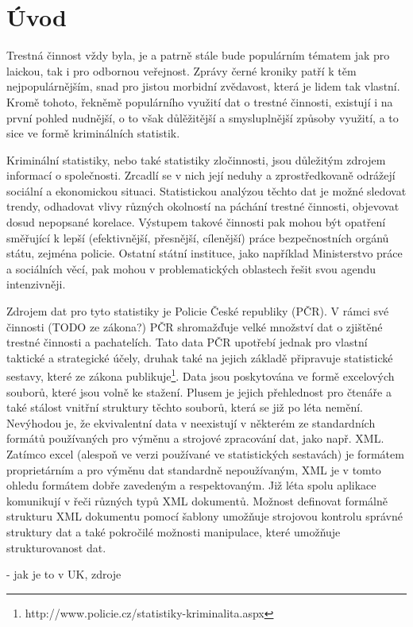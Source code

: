 \chapter*{Úvod}

Trestná činnost vždy byla, je a patrně stále bude populárním tématem jak pro laickou, tak i pro odbornou veřejnost. Zprávy černé kroniky patří k těm nejpopulárnějším, snad pro jistou morbidní zvědavost, která je lidem tak vlastní. Kromě tohoto, řekněmě populárního využití dat o trestné činnosti, existují i na první pohled nudnější, o to však důlěžitější a smysluplnější způsoby využití, a to sice ve formě kriminálních statistik.

Kriminální statistiky, nebo také statistiky zločinnosti, jsou důležitým zdrojem informací o společnosti. Zrcadlí se v nich její neduhy a zprostředkovaně odrážejí sociální a ekonomickou situaci. Statistickou analýzou těchto dat je možné sledovat trendy, odhadovat vlivy různých okolností na páchání trestné činnosti, objevovat dosud nepopsané korelace. Výstupem takové činnosti pak mohou být opatření směřující k lepší (efektivnější, přesnější, cílenější) práce bezpečnostních orgánů státu, zejména policie. Ostatní státní instituce, jako například Ministerstvo práce a sociálních věcí, pak mohou v problematických oblastech řešit svou agendu intenzivněji.

Zdrojem dat pro tyto statistiky je Policie České republiky (PČR). V rámci své činnosti (TODO ze zákona?) PČR shromažďuje velké množství dat o zjištěné trestné činnosti a pachatelích. Tato data PČR upotřebí jednak pro vlastní taktické a strategické účely, druhak také na jejich základě připravuje statistické sestavy, které ze zákona publikuje\footnote{http://www.policie.cz/statistiky-kriminalita.aspx}. Data jsou poskytována ve formě excelových souborů, které jsou volně ke stažení. Plusem je jejich přehlednost pro čtenáře a také stálost vnitřní struktury těchto souborů, která se již po léta nemění. Nevýhodou je, že ekvivalentní data v neexistují v některém ze standardních formátů používaných pro výměnu a strojové zpracování dat, jako např. XML. Zatímco excel (alespoň ve verzi používané ve statistických sestavách) je formátem proprietárním a pro výměnu dat standardně nepoužívaným, XML je v tomto ohledu formátem dobře zavedeným a respektovaným. Již léta spolu aplikace komunikují v řeči různých typů XML dokumentů. Možnost definovat formálně strukturu XML dokumentu pomocí šablony umožňuje strojovou kontrolu správné struktury dat a také pokročilé možnosti manipulace, které umožňuje strukturovanost dat.

- jak je to v UK, zdroje